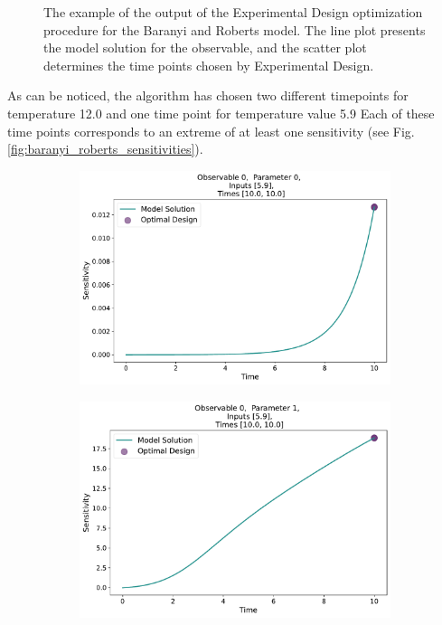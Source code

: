 \documentclass[10pt,A4paper]{article}
\begin{document}
\begin{figure}[H]
\begin{subfigure}{.9\textwidth}
      \end{subfigure}
    \caption{{\footnotesize The example of the output of the Experimental Design optimization procedure for the Baranyi and Roberts model. 
    The line plot presents the model solution for the observable, and the scatter plot determines the time points chosen by Experimental Design.}}
    \label{fig:baranyi_roberts_observable}
\end{figure}
 
As can be noticed, the algorithm has chosen two different timepoints for temperature 12.0 and  one time point for temperature value 5.9
Each of these time points corresponds to an extreme of at least one sensitivity (see Fig. \ref{fig:baranyi_roberts_sensitivities}). 
\begin{figure}[H]
    \begin{subfigure}{.9\textwidth}
      \centering
      \includegraphics[scale=0.35]{Figures/Sensitivity_Results_baranyi_roberts_ode_fisher_determinant_rel_sensit_cont_2times_2temps_000_x_00_p_00.pdf}
    \end{subfigure}
    \begin{subfigure}{.9\textwidth}
      \centering
      \includegraphics[scale=0.35]{Figures/Sensitivity_Results_baranyi_roberts_ode_fisher_determinant_rel_sensit_cont_2times_2temps_000_x_00_p_01.pdf}

\end{subfigure}
\end{figure}
\end{document}
